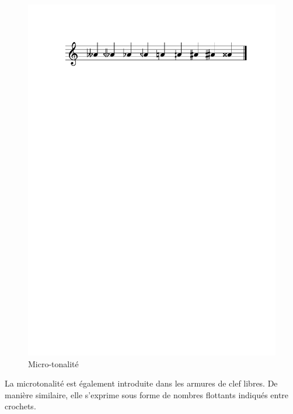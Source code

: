 \documentclass{article}
\begin{document}
\begin{figure}[h]
\centering
\includegraphics[width=\columnwidth]{img/partitions/alter.pdf}
\caption{Micro-tonalité}
\label{fig:alter}
\end{figure}

La microtonalité est également introduite dans les armures de clef libres. De manière similaire, elle s'exprime sous forme de nombres flottants indiqués entre crochets.
\end{document}
